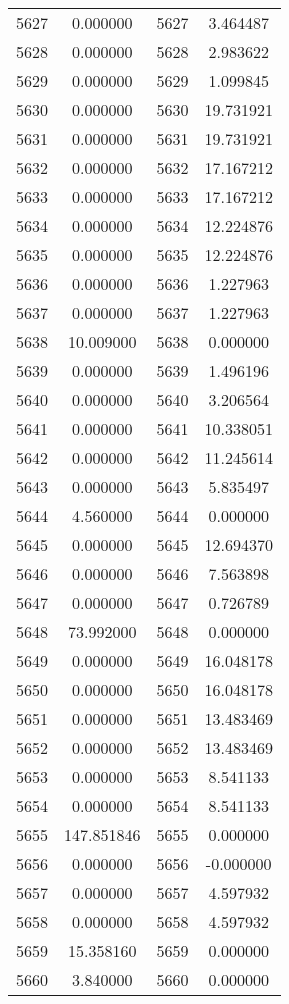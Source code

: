 \documentclass[12pt]{article}
\begin{document}
\begin{longtable}{@{}cccc@{}}
5627 & 0.000000 & 5627 & 3.464487 \\
5628 & 0.000000 & 5628 & 2.983622 \\
5629 & 0.000000 & 5629 & 1.099845 \\
5630 & 0.000000 & 5630 & 19.731921 \\
5631 & 0.000000 & 5631 & 19.731921 \\
5632 & 0.000000 & 5632 & 17.167212 \\
5633 & 0.000000 & 5633 & 17.167212 \\
5634 & 0.000000 & 5634 & 12.224876 \\
5635 & 0.000000 & 5635 & 12.224876 \\
5636 & 0.000000 & 5636 & 1.227963 \\
5637 & 0.000000 & 5637 & 1.227963 \\
5638 & 10.009000 & 5638 & 0.000000 \\
5639 & 0.000000 & 5639 & 1.496196 \\
5640 & 0.000000 & 5640 & 3.206564 \\
5641 & 0.000000 & 5641 & 10.338051 \\
5642 & 0.000000 & 5642 & 11.245614 \\
5643 & 0.000000 & 5643 & 5.835497 \\
5644 & 4.560000 & 5644 & 0.000000 \\
5645 & 0.000000 & 5645 & 12.694370 \\
5646 & 0.000000 & 5646 & 7.563898 \\
5647 & 0.000000 & 5647 & 0.726789 \\
5648 & 73.992000 & 5648 & 0.000000 \\
5649 & 0.000000 & 5649 & 16.048178 \\
5650 & 0.000000 & 5650 & 16.048178 \\
5651 & 0.000000 & 5651 & 13.483469 \\
5652 & 0.000000 & 5652 & 13.483469 \\
5653 & 0.000000 & 5653 & 8.541133 \\
5654 & 0.000000 & 5654 & 8.541133 \\
5655 & 147.851846 & 5655 & 0.000000 \\
5656 & 0.000000 & 5656 & -0.000000 \\
5657 & 0.000000 & 5657 & 4.597932 \\
5658 & 0.000000 & 5658 & 4.597932 \\
5659 & 15.358160 & 5659 & 0.000000 \\
5660 & 3.840000 & 5660 & 0.000000 \\

\end{longtable}
\end{document}
